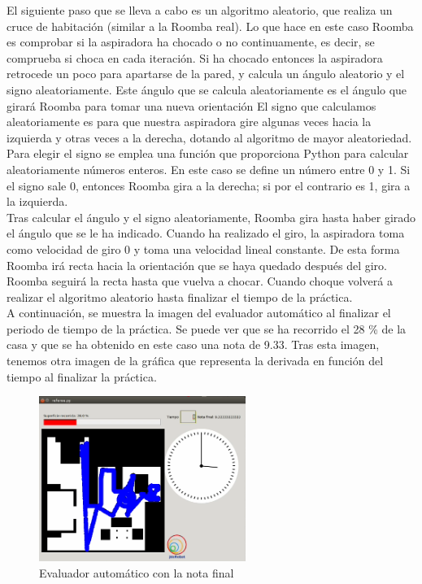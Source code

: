 El siguiente paso que se lleva a cabo es un algoritmo aleatorio, que realiza un cruce de habitación (similar a la Roomba real). Lo que hace en este caso Roomba es comprobar si la aspiradora ha chocado o no continuamente, es decir, se comprueba si choca en cada iteración. Si ha chocado entonces la aspiradora retrocede un poco para apartarse de la pared, y calcula un ángulo aleatorio y el signo aleatoriamente. Este ángulo que se calcula aleatoriamente es el ángulo que girará Roomba para tomar una nueva orientación El signo que calculamos aleatoriamente es para que nuestra aspiradora gire algunas veces hacia la izquierda y otras veces a la derecha, dotando al algoritmo de mayor aleatoriedad. Para elegir el signo se emplea una función que proporciona Python para calcular aleatoriamente números enteros. En este caso se define un número entre 0 y 1. Si el signo sale 0, entonces Roomba gira a la derecha; si por el contrario es 1, gira a la izquierda.\\

Tras calcular el ángulo y el signo aleatoriamente, Roomba gira hasta haber girado el ángulo que se le ha indicado. Cuando ha realizado el giro, la aspiradora toma como velocidad de giro 0 y toma una velocidad lineal constante. De esta forma Roomba irá recta hacia la orientación que se haya quedado después del giro. Roomba seguirá la recta hasta que vuelva a chocar. Cuando choque volverá a realizar el algoritmo aleatorio hasta finalizar el tiempo de la práctica.\\

A continuación, se muestra la imagen del evaluador automático al finalizar el periodo de tiempo de la práctica. Se puede ver que se ha recorrido el 28 \% de la casa y que se ha obtenido en este caso una nota de 9.33. Tras esta imagen, tenemos otra imagen de la gráfica que representa la derivada en función del tiempo al finalizar la práctica.\\


\begin{figure}[H]
  \begin{center}
    \includegraphics[width=0.6\textwidth]{figures/Vacuum/Referee_Roomba.png}
		\caption{Evaluador automático con la nota final}
		\label{fig.Referee_Roomba}
		\end{center}
\end{figure}

